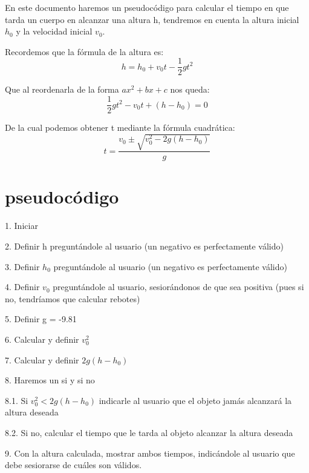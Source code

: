 \documentclass{article}
\begin{document}
En este documento haremos un pseudocódigo para calcular el tiempo en que tarda un cuerpo
en alcanzar una altura h, tendremos en cuenta la altura inicial $h_0$ y la velocidad inicial $v_0$.

Recordemos que la fórmula de la altura es:
\[h = h_0 + v_0t - \frac{1}{2}gt^2\]

Que al reordenarla de la forma $ax^2 + bx + c$ nos queda:
\[\frac{1}{2}gt^2 - v_0t + (h-h_0) = 0\]

De la cual podemos obtener t mediante la fórmula cuadrática:
\[t = \frac{v_0 \pm \sqrt{v_0^2 - 2g(h-h_0)}}{g}\]

\section{pseudocódigo}

1. Iniciar

2. Definir h preguntándole al usuario (un negativo es perfectamente válido)

3. Definir $h_0$ preguntándole al usuario (un negativo es perfectamente válido)

4. Definir $v_0$ preguntándole al usuario, sesiorándonos de que sea positiva (pues si no, tendríamos que calcular rebotes)

5. Definir g = -9.81

6. Calcular y definir $v_0^2$

7. Calcular y definir $2g(h-h_0)$

8. Haremos un si y si no

8.1. Si $v_0^2 < 2g(h-h_0)$ indicarle al usuario que el objeto jamás alcanzará la altura deseada

8.2. Si no, calcular el tiempo que le tarda al objeto alcanzar la altura deseada

9. Con la altura calculada, mostrar ambos tiempos, indicándole al usuario que debe sesiorarse de cuáles son válidos.
\end{document}
